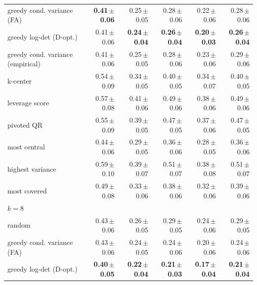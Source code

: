 \begin{tabular}{lrrrrr}
greedy cond. variance (FA) & \textbf{0.41\,{\scriptsize$\pm$0.06}} & 0.25\,{\scriptsize$\pm$0.05} & 0.28\,{\scriptsize$\pm$0.06} & 0.22\,{\scriptsize$\pm$0.06} & 0.28\,{\scriptsize$\pm$0.06} \\
greedy log-det (D-opt.) & 0.41\,{\scriptsize$\pm$0.06} & \textbf{0.24\,{\scriptsize$\pm$0.04}} & \textbf{0.26\,{\scriptsize$\pm$0.04}} & \textbf{0.20\,{\scriptsize$\pm$0.03}} & \textbf{0.26\,{\scriptsize$\pm$0.04}} \\
greedy cond. variance (empirical) & 0.41\,{\scriptsize$\pm$0.06} & 0.25\,{\scriptsize$\pm$0.05} & 0.28\,{\scriptsize$\pm$0.06} & 0.23\,{\scriptsize$\pm$0.06} & 0.29\,{\scriptsize$\pm$0.06} \\
k-center & 0.54\,{\scriptsize$\pm$0.09} & 0.34\,{\scriptsize$\pm$0.05} & 0.40\,{\scriptsize$\pm$0.05} & 0.34\,{\scriptsize$\pm$0.07} & 0.40\,{\scriptsize$\pm$0.05} \\
leverage score & 0.57\,{\scriptsize$\pm$0.08} & 0.41\,{\scriptsize$\pm$0.06} & 0.49\,{\scriptsize$\pm$0.06} & 0.38\,{\scriptsize$\pm$0.06} & 0.49\,{\scriptsize$\pm$0.06} \\
pivoted QR & 0.55\,{\scriptsize$\pm$0.09} & 0.39\,{\scriptsize$\pm$0.05} & 0.47\,{\scriptsize$\pm$0.05} & 0.37\,{\scriptsize$\pm$0.06} & 0.47\,{\scriptsize$\pm$0.05} \\
most central & 0.44\,{\scriptsize$\pm$0.06} & 0.29\,{\scriptsize$\pm$0.05} & 0.36\,{\scriptsize$\pm$0.06} & 0.28\,{\scriptsize$\pm$0.05} & 0.36\,{\scriptsize$\pm$0.06} \\
highest variance & 0.59\,{\scriptsize$\pm$0.10} & 0.39\,{\scriptsize$\pm$0.07} & 0.51\,{\scriptsize$\pm$0.07} & 0.38\,{\scriptsize$\pm$0.08} & 0.51\,{\scriptsize$\pm$0.07} \\
most covered & 0.49\,{\scriptsize$\pm$0.08} & 0.33\,{\scriptsize$\pm$0.06} & 0.38\,{\scriptsize$\pm$0.06} & 0.32\,{\scriptsize$\pm$0.06} & 0.39\,{\scriptsize$\pm$0.06} \\
\multicolumn{6}{l}{\emph{$k=8$}} \\
random & 0.43\,{\scriptsize$\pm$0.06} & 0.26\,{\scriptsize$\pm$0.05} & 0.29\,{\scriptsize$\pm$0.05} & 0.24\,{\scriptsize$\pm$0.06} & 0.29\,{\scriptsize$\pm$0.05} \\
greedy cond. variance (FA) & 0.43\,{\scriptsize$\pm$0.06} & 0.24\,{\scriptsize$\pm$0.05} & 0.24\,{\scriptsize$\pm$0.06} & 0.20\,{\scriptsize$\pm$0.06} & 0.24\,{\scriptsize$\pm$0.06} \\
greedy log-det (D-opt.) & \textbf{0.40\,{\scriptsize$\pm$0.05}} & \textbf{0.22\,{\scriptsize$\pm$0.04}} & \textbf{0.21\,{\scriptsize$\pm$0.03}} & \textbf{0.17\,{\scriptsize$\pm$0.04}} & \textbf{0.21\,{\scriptsize$\pm$0.04}} \\

\end{tabular}
